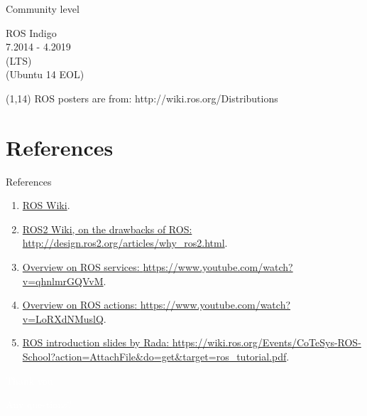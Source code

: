 \documentclass{beamer}
\begin{document}
\begin{frame}{Community level}
\begin{textblock}{3}
         \centering
         ROS Indigo\\
         \footnotesize 7.2014 - 4.2019\\
         (LTS)\\
         (Ubuntu 14 EOL)\\
     \end{textblock}   
 
 
\begin{textblock}{10}(1,14)
\tiny{ROS posters are from: http://wiki.ros.org/Distributions}
\end{textblock}     
     
                        
\end{frame}






\section{References}
\begin{frame}{References}

    \begin{enumerate}
        \item \href{http://wiki.ros.org/ROS/Introduction}{ROS Wiki}.
        \item \href{http://design.ros2.org/articles/why_ros2.html}{ROS2 Wiki, on the drawbacks of ROS:  \tiny{http://design.ros2.org/articles/why\_ros2.html}}.
        \item \href{https://www.youtube.com/watch?v=qhnlmrGQVvM}{Overview on ROS services: \tiny{https://www.youtube.com/watch?v=qhnlmrGQVvM}}.
        
         \item \href{https://www.youtube.com/watch?v=LoRXdNMuslQ}{Overview on ROS actions: \tiny{https://www.youtube.com/watch?v=LoRXdNMuslQ}}.   
             
        \item \href{https://wiki.ros.org/Events/CoTeSys-ROS-School?action=AttachFile&do=get&target=ros_tutorial.pdf}{ROS introduction slides by Rada: \tiny{https://wiki.ros.org/Events/CoTeSys-ROS-School?action=AttachFile\&do=get\&target=ros\_tutorial.pdf}}.
    \end{enumerate}
\end{frame}



\begin{frame}[plain]{}  
    \centering
    {\huge \textcolor{white}{Thank you}}
    
    \vspace{0.5cm}
    
    {\huge \textcolor{white}{Any questions?}}
\end{frame}
\end{document}
